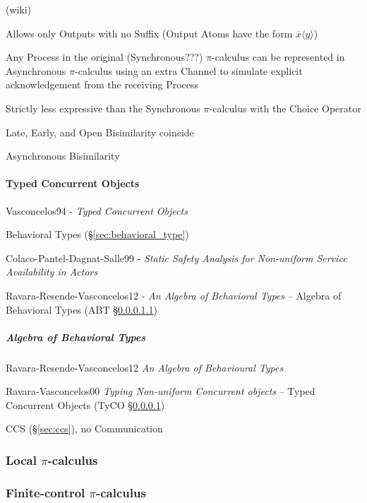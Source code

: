 (wiki)

Allows only Outputs with no Suffix (Output Atoms have the form
$\overline{x}\langle y \rangle$)

Any Process in the original (Synchronous???) $\pi$-calculus can be
represented in Asynchronous $\pi$-calculus using an extra Channel to
simulate explicit acknowledgement from the receiving Process

Strictly less expressive than the Synchronous $\pi$-calculus with the
Choice Operator

Late, Early, and Open Bisimilarity coincide %

Asynchronous Bisimilarity



\paragraph{Typed Concurrent Objects}\label{sec:tyco}\hfill

Vasconcelos94 - \emph{Typed Concurrent Objects}

\fist Behavioral Types (\S\ref{sec:behavioral_type})

Colaco-Pantel-Dagnat-Salle99 - \emph{Static Safety Analysis for
  Non-uniform Service Availability in Actors}

Ravara-Resende-Vasconcelos12 - \emph{An Algebra of Behavioral Types} --
\fist Algebra of Behavioral Types (ABT \S\ref{sec:abt})



\subparagraph{Algebra of Behavioral Types}\label{sec:abt}\hfill

Ravara-Resende-Vasconcelos12 \emph{An Algebra of Behavioural Types}

Ravara-Vasconcelos00 \emph{Typing Non-uniform Concurrent objects} --
Typed Concurrent Objects (TyCO \S\ref{sec:tyco})

CCS (\S\ref{sec:ccs}), no Communication



\subsubsection{Local $\pi$-calculus}\label{sec:local_pi_calculus}

\subsubsection{Finite-control $\pi$-calculus}
\label{sec:finitecontrol_pi_calculus}

